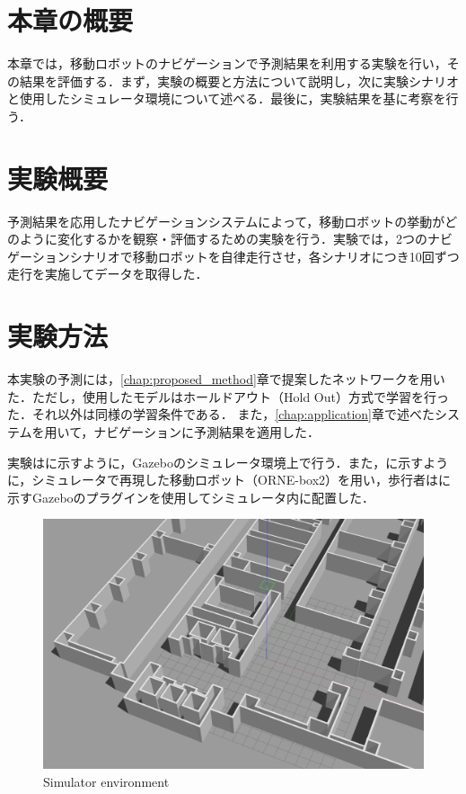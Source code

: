 

\section{本章の概要}
本章では，移動ロボットのナビゲーションで予測結果を利用する実験を行い，その結果を評価する．まず，実験の概要と方法について説明し，次に実験シナリオと使用したシミュレータ環境について述べる．最後に，実験結果を基に考察を行う．

\section{実験概要}
予測結果を応用したナビゲーションシステムによって，移動ロボットの挙動がどのように変化するかを観察・評価するための実験を行う．実験では，2つのナビゲーションシナリオで移動ロボットを自律走行させ，各シナリオにつき10回ずつ走行を実施してデータを取得した．

\section{実験方法}
本実験の予測には，\ref{chap:proposed_method}章で提案したネットワークを用いた．ただし，使用したモデルはホールドアウト（Hold Out）方式で学習を行った．それ以外は同様の学習条件である．
また，\ref{chap:application}章で述べたシステムを用いて，ナビゲーションに予測結果を適用した．

実験はに示すように，Gazebo\cite{Gazebo62:online}のシミュレータ環境上で行う．また，に示すように，シミュレータで再現した移動ロボット（ORNE-box2\cite{井口颯人2023屋外自律移動ロボットプラットフォーム-orne}）を用い，歩行者はに示すGazeboのプラグイン\cite{Actors-G87:online}を使用してシミュレータ内に配置した．

\begin{figure}[H]
  \centering
 \includegraphics[keepaspectratio, scale=0.15]
      {images/sim-env.png}
\caption{Simulator environment}
 \label{Fig:sim-env}
\end{figure} 

